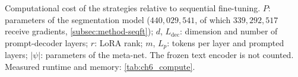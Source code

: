 \begin{table}[tb]
\centering
\caption[Computational cost of the strategies]{Computational cost of the strategies relative to sequential fine-tuning. $P$: parameters of the segmentation model ($440{,}029{,}541$, of which $339{,}292{,}517$ receive gradients, \cref{subsec:method-seqft}); $d$, $L_{\mathrm{dec}}$: dimension and number of prompt-decoder layers; $r$: LoRA rank; $m$, $L_p$: tokens per layer and prompted layers; $|\psi|$: parameters of the meta-net. The frozen text encoder is not counted. Measured runtime and memory: \cref{tab:ch6_compute}.}
\label{tab:method-complexity}

\end{table}
